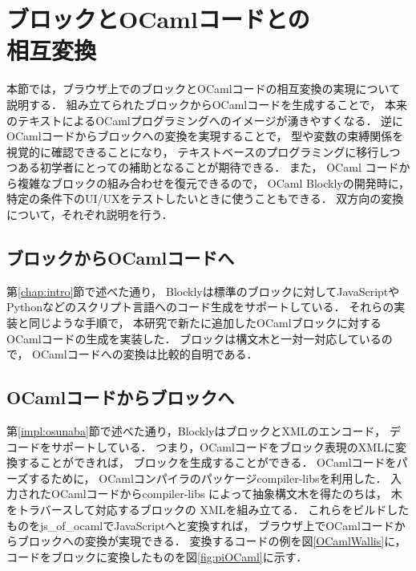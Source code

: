 \chapter[ブロックとOCamlコードとの相互変換]{ブロックとOCamlコードとの\\相互変換}\label{chap:converter}


本節では，ブラウザ上でのブロックとOCamlコードの相互変換の実現について説明する．
組み立てられたブロックからOCamlコードを生成することで，
本来のテキストによるOCamlプログラミングへのイメージが湧きやすくなる．
逆にOCamlコードからブロックへの変換を実現することで，
型や変数の束縛関係を視覚的に確認できることになり，
テキストベースのプログラミングに移行しつつある初学者にとっての補助となることが期待できる．
また， OCaml コードから複雑なブロックの組み合わせを復元できるので，
OCaml Blocklyの開発時に，
特定の条件下のUI/UXをテストしたいときに使うこともできる．
双方向の変換について，それぞれ説明を行う．

\section {ブロックからOCamlコードへ}
第\ref{chap:intro}節で述べた通り，
Blocklyは標準のブロックに対してJavaScriptやPythonなどのスクリプト言語へのコード生成をサポートしている．
それらの実装と同じような手順で，
本研究で新たに追加したOCamlブロックに対するOCamlコードの生成を実装した．
ブロックは構文木と一対一対応しているので，
OCamlコードへの変換は比較的自明である．
\section {OCamlコードからブロックへ}
第\ref{impl:osunaba}節で述べた通り，BlocklyはブロックとXMLのエンコード，
デコードをサポートしている．
つまり，OCamlコードをブロック表現のXMLに変換することができれば，
ブロックを生成することができる．
OCamlコードをパーズするために，
OCamlコンパイラのパッケージcompiler-libsを利用した．
入力されたOCamlコードからcompiler-libs によって抽象構文木を得たのちは，
木をトラバースして対応するブロックの XMLを組み立てる．
これらをビルドしたものをjs\_of\_ocamlでJavaScriptへと変換すれば，
ブラウザ上でOCamlコードからブロックへの変換が実現できる．
変換するコードの例を図\ref{OCamlWallis}に，
コードをブロックに変換したものを図\ref{fig:piOCaml}に示す．


